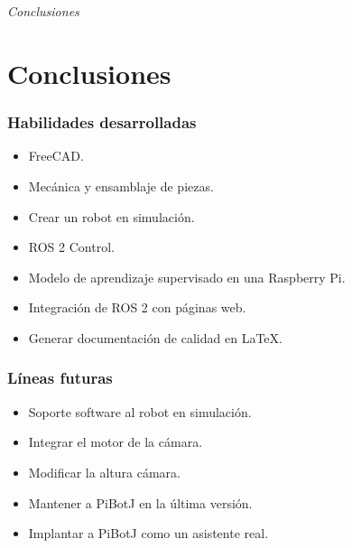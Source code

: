 \documentclass{beamer}
\begin{document}
\section*{}
\begin{frame}{}
  \centering \Huge
  \emph{Conclusiones}
\end{frame}

\section{Conclusiones}
\begin{frame}
\frametitle{Habilidades desarrolladas}
\begin{itemize}
\item FreeCAD.
\item Mecánica y ensamblaje de piezas.
\item Crear un robot en simulación.
\item ROS 2 Control.
\item Modelo de aprendizaje supervisado en una Raspberry Pi.
\item Integración de ROS 2 con páginas web.
\item Generar documentación de calidad en LaTeX.
\end{itemize}
\end{frame}
	

\begin{frame}
\frametitle{Líneas futuras}
\begin{itemize}
\item Soporte software al robot en simulación.
\item Integrar el motor de la cámara.
\item Modificar la altura cámara.
\item Mantener a PiBotJ en la última versión.
\item Implantar a PiBotJ como un asistente real.
\end{itemize}
\end{frame}
\end{document}
